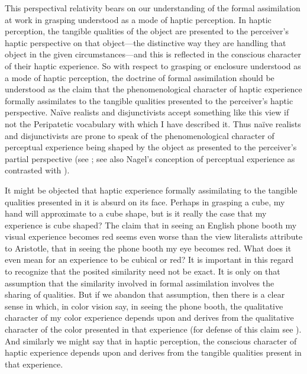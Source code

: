 This perspectival relativity bears on our understanding of the formal assimilation at work in grasping understood as a mode of haptic perception. In haptic perception, the tangible qualities of the object are presented to the perceiver's haptic perspective on that object---the distinctive way they are handling that object in the given circumstances---and this is reflected in the conscious character of their haptic experience. So with respect to grasping or enclosure understood as a mode of haptic perception, the doctrine of formal assimilation should be understood as the claim that the phenomenological character of haptic experience formally assimilates to the tangible qualities presented to the perceiver's haptic perspective. Na\"{i}ve realists and disjunctivists accept something like this view if not the Peripatetic vocabulary with which I have described it. Thus na\"{i}ve realists and disjunctivists are prone to speak of the phenomenological character of perceptual experience being shaped by the object as presented to the perceiver's partial perspective (see \citealt{McDowell:1998vn,Martin:2004fj,Fish:2009fk,Kalderon:2011fk}; see also Nagel's \citeyear{Nagel:1979fk} conception of perceptual experience as contrasted with \citealt{Jackson:1982my}).

It might be objected that haptic experience formally assimilating to the tangible qualities presented in it is absurd on its face. Perhaps in grasping a cube, my hand will approximate to a cube shape, but is it really the case that my experience is cube shaped? The claim that in seeing an English phone booth my visual experience becomes red seems even worse than the view literalists attribute to Aristotle, that in seeing the phone booth my eye becomes red. What does it even mean for an experience to be cubical or red? It is important in this regard to recognize that the posited similarity need not be exact. It is only on that assumption that the similarity involved in formal assimilation involves the sharing of qualities. But if we abandon that assumption, then there is a clear sense in which, in color vision say, in seeing the phone booth, the qualitative character of my color experience depends upon and derives from the qualitative character of the color presented in that experience (for defense of this claim see \citealt{Kalderon:2008fk,Kalderon:2007mr,Kalderon:2011fk}). And similarly we might say that in haptic perception, the conscious character of haptic experience depends upon and derives from the tangible qualities present in that experience. 

